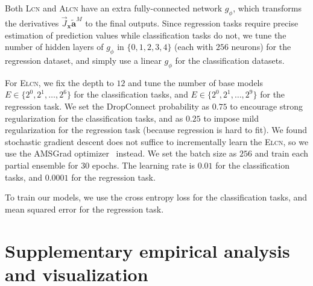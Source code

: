 \documentclass{article} \usepackage{iclr2020_conference,times}
\def\va{{\bm{a}}}
\def\vx{{\bm{x}}}
\begin{document}
Both \textsc{Lcn} and \textsc{Alcn} have an extra fully-connected network $g_\phi$, which transforms the derivatives $\vec{J}_\vx \tilde \va^M$ to the final outputs. Since regression tasks require precise estimation of prediction values while classification tasks do not, we tune the number of hidden layers of $g_\phi$ in $\{0,1,2,3,4\}$ (each with $256$ neurons) for the regression dataset, and simply use a linear $g_\phi$ for the classification datasets. 


For \textsc{Elcn}, we fix the depth to $12$ and tune the number of base models $E \in \{2^0, 2^1,\dots,2^6\}$ for the classification tasks, and $E \in \{2^0, 2^1, \dots, 2^9\}$ for the regression task. 
We set the DropConnect probability as $0.75$ to encourage strong regularization for the classification tasks, and as $0.25$ to impose mild regularization for the regression task (because regression is hard to fit).
We found stochastic gradient descent does not suffice to incrementally learn the \textsc{Elcn}, so we use the AMSGrad optimizer~\citep{reddi2019convergence} instead. We set the batch size as $256$ and train each partial ensemble for $30$ epochs. The learning rate is $0.01$ for the classification tasks, and $0.0001$ for the regression task.

To train our models, we use the cross entropy loss for the classification tasks, and mean squared error for the regression task.

\vspace{-1mm}
\section{Supplementary empirical analysis and visualization}\label{appendix:exp:analysis}
\vspace{-1mm}
\end{document}
